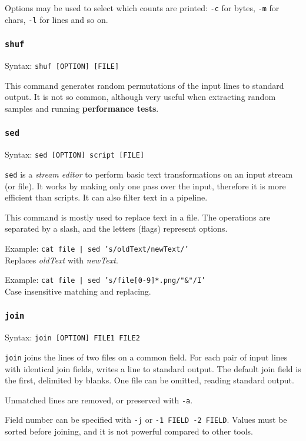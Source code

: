 Options may be used to select which counts are printed: \texttt{-c} for bytes, \texttt{-m} for chars, \texttt{-l} for lines and so on.

\subsubsection{\texttt{shuf}}
Syntax: \texttt{shuf [OPTION] [FILE]}

This command generates random permutations of the input lines to standard output. It is not so common, although very useful when extracting random samples and running \textbf{performance tests}.

\subsubsection{\texttt{sed}}
Syntax: \texttt{sed [OPTION] {script} [FILE]}

\texttt{sed} is a \textit{stream editor} to perform basic text transformations on an input stream (or file). It works by making only one pass over the input, therefore it is more efficient than scripts. It can also filter text in a pipeline.

This command is mostly used to replace text in a file. The operations are separated by a slash, and the letters (flags) represent options.

Example: \texttt{cat file | sed 's/oldText/newText/'} \\
Replaces \textit{oldText} with \textit{newText}.

Example: \texttt{cat file | sed 's/file[0-9]*.png/"\&"/I'} \\
Case insensitive matching and replacing.

\subsubsection{\texttt{join}}
Syntax: \texttt{join [OPTION] FILE1 FILE2}

\texttt{join} joins the lines of two files on a common field. For each pair of input lines with identical join fields, writes a line to standard output. The default join field is the first, delimited by blanks. One file can be omitted, reading standard output.

Unmatched lines are removed, or preserved with \texttt{-a}.

Field number can be specified with \texttt{-j} or \texttt{-1 FIELD -2 FIELD}. Values must be sorted before joining, and it is not powerful compared to other tools.

